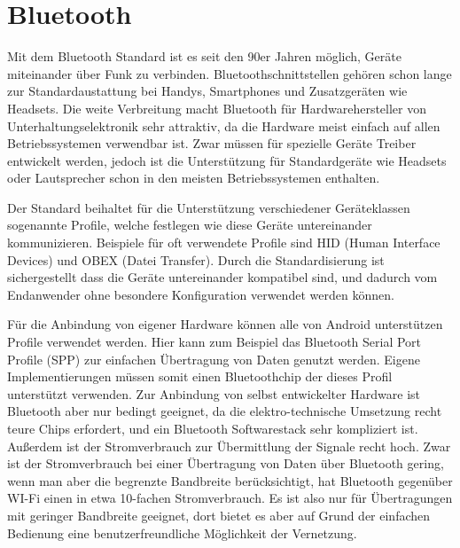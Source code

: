 \documentclass[12pt,journal,compsoc]{IEEEtran}
\begin{document}
\section{Bluetooth}
Mit dem Bluetooth Standard ist es seit den 90er Jahren möglich, Geräte miteinander über Funk zu verbinden. Bluetoothschnittstellen gehören schon lange zur Standardaustattung bei Handys, Smartphones und Zusatzgeräten wie Headsets.
Die weite Verbreitung macht Bluetooth für Hardwarehersteller von Unterhaltungselektronik sehr attraktiv, da die Hardware meist einfach auf allen Betriebssystemen verwendbar ist.
Zwar müssen für spezielle Geräte Treiber entwickelt werden, jedoch ist die Unterstützung für Standardgeräte wie Headsets oder Lautsprecher schon in den meisten Betriebssystemen enthalten.

Der Standard beihaltet für die Unterstützung verschiedener Geräteklassen sogenannte Profile, welche festlegen wie diese Geräte untereinander kommunizieren.
Beispiele für oft verwendete Profile sind HID (Human Interface Devices) und OBEX (Datei Transfer). 
Durch die Standardisierung ist sichergestellt dass die Geräte untereinander kompatibel sind, und dadurch vom Endanwender ohne besondere Konfiguration verwendet werden können.
\cite{bluetooth}

Für die Anbindung von eigener Hardware können alle von Android unterstützen Profile verwendet werden. Hier kann zum Beispiel das Bluetooth Serial Port Profile (SPP) zur einfachen Übertragung von Daten genutzt werden.
Eigene Implementierungen müssen somit einen Bluetoothchip der dieses Profil unterstützt verwenden.
Zur Anbindung von selbst entwickelter Hardware ist Bluetooth aber nur bedingt geeignet, da die elektro-technische Umsetzung recht teure Chips erfordert, und ein Bluetooth Softwarestack sehr kompliziert ist. Außerdem ist der Stromverbrauch zur Übermittlung der Signale recht hoch.
Zwar ist der Stromverbrauch bei einer Übertragung von Daten über Bluetooth gering, wenn man aber die begrenzte Bandbreite berücksichtigt, hat Bluetooth gegenüber WI-Fi einen in etwa 10-fachen Stromverbrauch.\cite{wireless}
Es ist also nur für Übertragungen mit geringer Bandbreite geeignet, dort bietet es aber auf Grund der einfachen Bedienung eine benutzerfreundliche Möglichkeit der Vernetzung.
\end{document}
